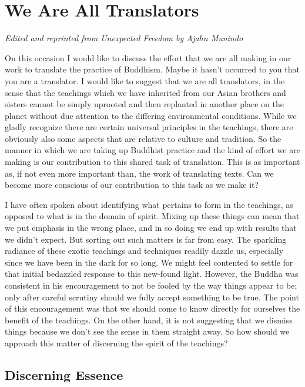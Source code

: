 \chapter{We Are All Translators}

{\raggedright
\emph{Edited and reprinted from \emph{Unexpected Freedom}\cite{unexpected} by Ajahn Munindo}
\par}

\bigskip

On this occasion I would like to discuss the effort that we are all
making in our work to translate the practice of Buddhism. Maybe it
hasn't occurred to you that you are a translator. I would like to
suggest that we are all translators, in the sense that the teachings
which we have inherited from our Asian brothers and sisters cannot be
simply uprooted and then replanted in another place on the planet
without due attention to the differing environmental conditions. While
we gladly recognize there are certain universal principles in the
teachings, there are obviously also some aspects that are relative to
culture and tradition. So the manner in which we are taking up Buddhist
practice and the kind of effort we are making is our contribution to
this shared task of translation. This is as important as, if not even
more important than, the work of translating texts. Can we become more
conscious of our contribution to this task as we make it?

I have often spoken about identifying what pertains to form in the
teachings, as opposed to what is in the domain of spirit. Mixing up
these things can mean that we put emphasis in the wrong place, and in so
doing we end up with results that we didn't expect. But sorting out such
matters is far from easy. The sparkling radiance of these exotic
teachings and techniques readily dazzle us, especially since we have
been in the dark for so long. We might feel contented to settle for that
initial bedazzled response to this new-found light. However, the Buddha
was consistent in his encouragement to not be fooled by the way things
appear to be; only after careful scrutiny should we fully accept
something to be true. The point of this encouragement was that we should
come to know directly for ourselves the benefit of the teachings. On the
other hand, it is not suggesting that we dismiss things because we don't
see the sense in them straight away. So how should we approach this
matter of discerning the spirit of the teachings?

\section{Discerning Essence}

